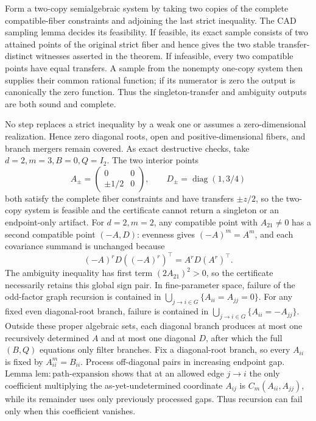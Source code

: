 Form a two-copy semialgebraic system by taking two copies of the complete compatible-fiber constraints and adjoining the last strict inequality.  The CAD sampling lemma decides its feasibility.  If feasible, its exact sample consists of two attained points of the original strict fiber and hence gives the two stable transfer-distinct witnesses asserted in the theorem.  If infeasible, every two compatible points have equal transfers.  A sample from the nonempty one-copy system then supplies their common rational function; if its numerator is zero the output is canonically the zero function.  Thus the singleton-transfer and ambiguity outputs are both sound and complete.

No step replaces a strict inequality by a weak one or assumes a zero-dimensional realization.  Hence zero diagonal roots, open and positive-dimensional fibers, and branch mergers remain covered.  As exact destructive checks, take \(d=2,m=3,B=0,Q=I_2\).  The two interior points
\[
 A_{\pm}=\begin{pmatrix}0&0\\ \pm1/2&0\end{pmatrix},
 \qquad D_{\pm}=\operatorname{diag}(1,3/4)
\]
both satisfy the complete fiber constraints and have transfers \(\pm z/2\), so the two-copy system is feasible and the certificate cannot return a singleton or an endpoint-only artifact.  For \(d=2,m=2\), any compatible point with \(A_{21}\ne0\) has a second compatible point \((-A,D)\): evenness gives \((-A)^m=A^m\), and each covariance summand is unchanged because
\[
 (-A)^rD((-A)^r)^\top=A^rD(A^r)^\top.
\]
The ambiguity inequality has first term \((2A_{21})^2>0\), so the certificate necessarily retains this global sign pair.
In fine-parameter space, failure of the odd-factor graph recursion is contained in \(\bigcup_{j\to i\in G}\{A_{ii}=A_{jj}=0\}\). For any fixed even diagonal-root branch, failure is contained in \(\bigcup_{j\to i\in G}\{A_{ii}=-A_{jj}\}\). Outside these proper algebraic sets, each diagonal branch produces at most one recursively determined \(A\) and at most one diagonal \(D\), after which the full \((B,Q)\) equations only filter branches.
Fix a diagonal-root branch, so every \(A_{ii}\) is fixed by \(A_{ii}^m=B_{ii}\).  Process off-diagonal pairs in increasing endpoint gap.  Lemma \(\mathrm{lem{:}path\mbox{-}expansion}\) shows that at an allowed edge \(j\to i\) the only coefficient multiplying the as-yet-undetermined coordinate \(A_{ij}\) is \(C_m(A_{ii},A_{jj})\), while its remainder uses only previously processed gaps.  Thus recursion can fail only when this coefficient vanishes.

